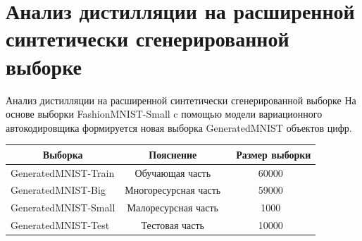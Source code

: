 \documentclass[10pt,pdf,hyperref={unicode}]{beamer}
\begin{document}
\section{Анализ дистилляции на расширенной синтетически сгенерированной выборке}
\begin{frame}{Анализ дистилляции на расширенной синтетически сгенерированной выборке}
\justifying
На основе выборки FashionMNIST-Small c помощью модели вариационного автокодировщика формируется новая выборка GeneratedMNIST объектов цифр.


\begin{table}[h!t]
\begin{center}
\label{table_1}
\begin{tabular}{|c|c|c|}
\hline
	Выборка & Пояснение &\ Размер выборки\\
	\hline
	\multicolumn{1}{|l|}{GeneratedMNIST-Train}
	& Обучающая часть& 60000\\
	\hline
	\multicolumn{1}{|l|}{GeneratedMNIST-Big}
	& Многоресурсная часть& 59000\\
	\hline
	\multicolumn{1}{|l|}{GeneratedMNIST-Small}
	& Малоресурсная часть& 1000\\
	\hline
	\multicolumn{1}{|l|}{GeneratedMNIST-Test}
	& Тестовая часть& 10000\\

\hline

\end{tabular}
\end{center}
\end{table}

\end{frame}

\end{document}
